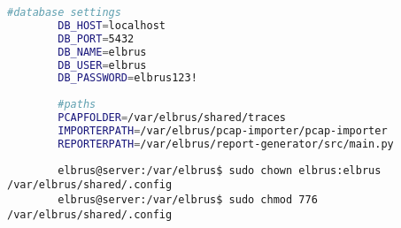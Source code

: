 	\lstset{style=files}
	\begin{lstlisting}[caption={Anhand von '.config.example' eigene '.config' Datei in \newline'/var/elbrus/shared' anlegen.}, language=bash]
		#database settings
		DB_HOST=localhost
		DB_PORT=5432
		DB_NAME=elbrus
		DB_USER=elbrus
		DB_PASSWORD=elbrus123!
		
		#paths
		PCAPFOLDER=/var/elbrus/shared/traces
		IMPORTERPATH=/var/elbrus/pcap-importer/pcap-importer
		REPORTERPATH=/var/elbrus/report-generator/src/main.py
	\end{lstlisting}
	
	\lstset{style=commands}
	\begin{lstlisting}
		elbrus@server:/var/elbrus$ sudo chown elbrus:elbrus /var/elbrus/shared/.config
		elbrus@server:/var/elbrus$ sudo chmod 776 /var/elbrus/shared/.config
	\end{lstlisting}